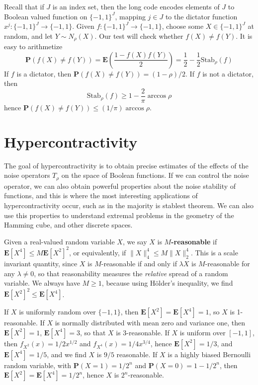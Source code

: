 Recall that if $J$ is an index set, then the long code encodes elements of $J$ to Boolean valued function on $\{ -1, 1 \}^J$, mapping $j \in J$ to the dictator function $x^j: \{ -1, 1 \}^J \to \{ -1, 1 \}$. Given $f: \{ -1, 1 \}^J \to \{ -1, 1 \}$, choose some $X \in \{ -1, 1 \}^J$ at random, and let $Y \sim N_{\rho}(X)$. Our test will check whether $f(X) \neq f(Y)$. It is easy to arithmetize
%
\[ \mathbf{P}(f(X) \neq f(Y)) = \mathbf{E} \left( \frac{1 - f(X)f(Y)}{2} \right) = \frac{1}{2} - \frac{1}{2} \text{Stab}_\rho(f) \]
%
If $f$ is a dictator, then $\mathbf{P}(f(X) \neq f(Y)) = (1 - \rho)/2$. If $f$ is not a dictator, then
%
\[ \text{Stab}_\rho(f) \geq 1 - \frac{2}{\pi} \arccos \rho \]
%
hence $\mathbf{P}(f(X) \neq f(Y)) \leq (1/\pi) \arccos \rho$.






\chapter{Hypercontractivity}

The goal of hypercontractivity is to obtain precise estimates of the effects of the noise operators $T_\rho$ on the space of Boolean functions. If we can control the noise operator, we can also obtain powerful properties about the noise stability of functions, and this is where the most interesting applications of hypercontractivity occur, such as in the majority is stablest theorem. We can also use this properties to understand extremal problems in the geometry of the Hamming cube, and other discrete spaces.

Given a real-valued random variable $X$, we say $X$ is {\bf $M$-reasonable} if $\mathbf{E}[X^4] \leq M \mathbf{E}[X^2]^2$, or equivalently, if $\| X \|_4^4 \leq M \| X \|_2^4$. This is a scale invariant quantity, since $X$ is $M$-reasonable if and only if $\lambda X$ is $M$-reasonable for any $\lambda \neq 0$, so that reasonability measures the {\it relative} spread of a random variable. We always have $M \geq 1$, because using H\"{o}lder's inequality, we find $\mathbf{E}[X^2]^2 \leq \mathbf{E}[X^4]$.

\begin{example}
    If $X$ is uniformly random over $\{ -1, 1 \}$, then $\mathbf{E}[X^2] = \mathbf{E}[X^4] = 1$, so $X$ is 1-reasonable. If $X$ is normally distributed with mean zero and variance one, then $\mathbf{E}[X^2] = 1$, $\mathbf{E}[X^4] = 3$, so that $X$ is 3-reasonable. If $X$ is uniform over $[-1,1]$, then $f_{X^2}(x) = 1/2x^{1/2}$ and $f_{X^4}(x) = 1/4x^{3/4}$, hence $\mathbf{E}[X^2] = 1/3$, and $\mathbf{E}[X^4] = 1/5$, and we find $X$ is $9/5$ reasonable. If $X$ is a highly biased Bernoulli random variable, with $\mathbf{P}(X = 1) = 1/2^n$ and $\mathbf{P}(X = 0) = 1 - 1/2^n$, then $\mathbf{E}[X^2] = \mathbf{E}[X^4] = 1/2^n$, hence $X$ is $2^n$-reasonable.
\end{example}

